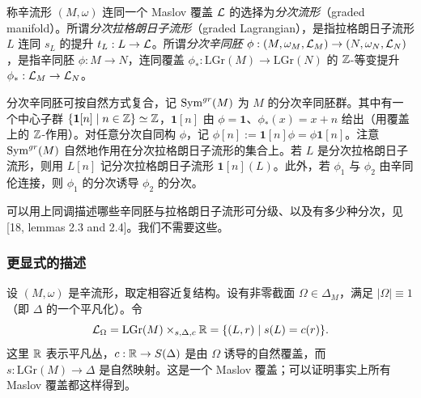 称辛流形 $(M,\omega)$ 连同一个 Maslov 覆盖 $\mathcal{L}$ 的选择为\emph{分次流形}（graded manifold）。所谓\emph{分次拉格朗日子流形}（graded Lagrangian），是指拉格朗日子流形 $L$ 连同 $s_L$ 的提升 $t_L: L\to\mathcal{L}$。所谓\emph{分次辛同胚} $\phi: (M,\omega_M,\mathcal{L}_M)\to(N,\omega_N,\mathcal{L}_N)$，是指辛同胚 $\phi: M\to N$，连同覆盖 $\phi_*: \mathrm{LGr}(M)\to\mathrm{LGr}(N)$ 的 $\mathbb{Z}$-等变提升 $\phi_*: \mathcal{L}_M\to\mathcal{L}_N$。

分次辛同胚可按自然方式复合，记 $\operatorname{Sym}^{gr}(M)$ 为 $M$ 的分次辛同胚群。其中有一个中心子群 $\{\mathbf 1[n]\mid n\in\mathbb{Z}\}\simeq\mathbb{Z}$，$\mathbf 1[n]$ 由 $\phi=\mathbf 1$、$\phi_*(x)=x+n$ 给出（用覆盖上的 $\mathbb{Z}$-作用）。对任意分次自同构 $\phi$，记 $\phi[n]:=\mathbf 1[n]\phi=\phi\mathbf 1[n]$。注意 $\operatorname{Sym}^{gr}(M)$ 自然地作用在分次拉格朗日子流形的集合上。若 $L$ 是分次拉格朗日子流形，则用 $L[n]$ 记分次拉格朗日子流形 $\mathbf 1[n](L)$。此外，若 $\phi_1$ 与 $\phi_2$ 由辛同伦连接，则 $\phi_1$ 的分次诱导 $\phi_2$ 的分次。



可以用上同调描述哪些辛同胚与拉格朗日子流形可分级、以及有多少种分次，见 [18, lemmas 2.3 and 2.4]。我们不需要这些。

\subsubsection{更显式的描述}
\label{subsec:graded-explicit}

设 $(M,\omega)$ 是辛流形，取定相容近复结构。设有非零截面 $\Omega\in\Delta_M$，满足 $|\Omega|\equiv 1$（即 $\Delta$ 的一个平凡化）。令
\[
  \mathcal{L}_\Omega = \mathrm{LGr}(M)\times_{s,\Delta,c}\mathbb{R} = \{(L,r)\mid s(L)=c(r)\}.
\]
这里 $\mathbb{R}$ 表示平凡丛，$c: \mathbb{R}\to S(\Delta)$ 是由 $\Omega$ 诱导的自然覆盖，而 $s: \mathrm{LGr}(M)\to\Delta$ 是自然映射。这是一个 Maslov 覆盖；可以证明事实上所有 Maslov 覆盖都这样得到。

